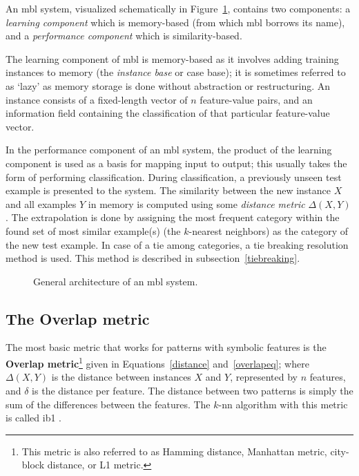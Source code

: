 \documentclass{book}
\begin{document}
An {\sc mbl} system, visualized schematically in
Figure~\ref{mbl-method}, contains two components: a {\em learning
component}\/ which is memory-based (from which {\sc mbl} borrows its
name), and a {\em performance component}\/ which is similarity-based.

The learning component of {\sc mbl} is memory-based as it involves
adding training instances to memory (the {\em instance base} or case
base); it is sometimes referred to as `lazy' as memory storage is done
without abstraction or restructuring.  An instance consists of a
fixed-length vector of $n$ feature-value pairs, and an information
field containing the classification of that particular feature-value
vector.  

In the performance component of an {\sc mbl} system, the product of
the learning component is used as a basis for mapping input to output;
this usually takes the form of performing classification.  During
classification, a previously unseen test example is presented to the
system. The similarity between the new instance $X$ and all examples
$Y$ in memory is computed using some {\em distance metric}
$\Delta(X,Y)$. The extrapolation is done by assigning the most
frequent category within the found set of most similar example(s) (the
$k$-nearest neighbors) as the category of the new test example. In
case of a tie among categories, a tie breaking resolution method is
used. This method is described in subsection~\ref{tiebreaking}.

\begin{figure}[htb]
        \begin{center}
                \leavevmode
                \epsfxsize=8cm
                \caption{General architecture of an {\sc mbl} system.
                }
                \label{mbl-method}
        \end{center}
\end{figure}

\subsection{The Overlap metric}
\label{overlap}

The most basic metric that works for patterns with symbolic features
is the {\bf Overlap metric}\footnote{This metric is also referred to
as Hamming distance, Manhattan metric, city-block distance, or L1
metric.} given in Equations~\ref{distance} and~\ref{overlapeq}; where
$\Delta(X,Y)$ is the distance between instances $X$ and $Y$,
represented by $n$ features, and $\delta$ is the distance per
feature. The distance between two patterns is simply the sum of the
differences between the features. The $k$-{\sc nn} algorithm with this
metric is called {\sc ib1} \cite{Aha+91}. 
\end{document}
